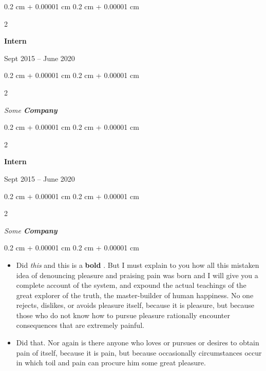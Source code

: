 \documentclass[10pt, letterpaper]{article}
\newenvironment{highlights}{
    \begin{itemize}[
        topsep=0.10 cm,
        parsep=0.10 cm,
        partopsep=0pt,
        itemsep=0pt,
        leftmargin=0.4 cm + 10pt
    ]
}{
    \end{itemize}
} %
\newenvironment{onecolentry}{
    \begin{adjustwidth}{
        0.2 cm + 0.00001 cm
    }{
        0.2 cm + 0.00001 cm
    }
}{
    \end{adjustwidth}
} %
\newenvironment{twocolentry}[2][]{
    \onecolentry
    \def\secondColumn{#2}
    \setcolumnwidth{\fill, 4.5 cm}
    \begin{paracol}{2}
}{
    \switchcolumn \raggedleft \secondColumn
    \end{paracol}
    \endonecolentry
} %
\let\hrefWithoutArrow\href
\renewcommand{\href}[2]{\hrefWithoutArrow{#1}{\ifthenelse{\equal{#2}{}}{ }{#2 }\raisebox{.15ex}{\footnotesize \faExternalLink*}}}
\begin{document}
        \vspace{0.2 cm}

                \begin{twocolentry}{
                    Sept 2015 – June 2020
                }
                \textbf{Intern}
                \end{twocolentry}
            \begin{twocolentry}{
            }
            \textit{Some \textbf{Company}}
            \end{twocolentry}



        \vspace{0.2 cm}

                \begin{twocolentry}{
                    Sept 2015 – June 2020
                }
                \textbf{Intern}
                \end{twocolentry}
            \begin{twocolentry}{
            }
            \textit{Some \textbf{Company}}
            \end{twocolentry}

        \vspace{0.10 cm}
        \begin{onecolentry}
            \begin{highlights}
                \item Did \textit{this} and this is a \textbf{bold} \href{https://example.com}{link}. But I must explain to you how all this mistaken idea of denouncing pleasure and praising pain was born and I will give you a complete account of the system, and expound the actual teachings of the great explorer of the truth, the master-builder of human happiness. No one rejects, dislikes, or avoids pleasure itself, because it is pleasure, but because those who do not know how to pursue pleasure rationally encounter consequences that are extremely painful.
                \item Did that. Nor again is there anyone who loves or pursues or desires to obtain pain of itself, because it is pain, but because occasionally circumstances occur in which toil and pain can procure him some great pleasure.
            \end{highlights}
        \end{onecolentry}
\end{document}
